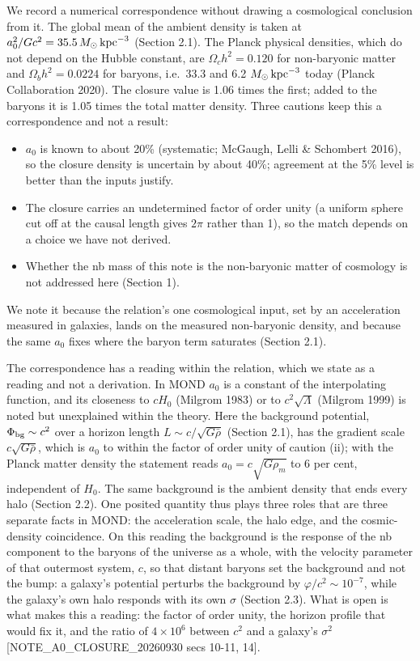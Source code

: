 \documentclass[
  10pt,
]{article}
\begin{document}
We record a numerical correspondence without drawing a cosmological
conclusion from it. The global mean of the ambient density is taken at
$a_0^2/Gc^2=35.5\,M_\odot\,{\rm kpc}^{-3}$ (Section 2.1). The Planck
physical densities, which do not depend on the Hubble constant, are
$\Omega_ch^2=0.120$ for non-baryonic matter and $\Omega_bh^2=0.0224$ for
baryons, i.e.\ 33.3 and 6.2 $M_\odot\,{\rm kpc}^{-3}$ today (Planck
Collaboration 2020). The closure value is 1.06 times the first; added to
the baryons it is 1.05 times the total matter density. Three cautions keep
this a correspondence and not a result:
\begin{itemize}
\item[(i)] $a_0$ is known to about 20\% (systematic; McGaugh, Lelli \& Schombert 2016), so the closure density is uncertain by about 40\%; agreement at the 5\% level is better than the inputs justify.
\item[(ii)] The closure carries an undetermined factor of order unity (a uniform sphere cut off at the causal length gives $2\pi$ rather than 1), so the match depends on a choice we have not derived.
\item[(iii)] Whether the nb mass of this note is the non-baryonic matter of cosmology is not addressed here (Section 1).
\end{itemize}
We note it because the relation's one cosmological input, set by an acceleration measured in galaxies, lands on the measured non-baryonic density, and because the same $a_0$ fixes where the baryon term saturates (Section 2.1).

The correspondence has a reading within the relation, which we state as a reading and not a derivation. In MOND $a_0$ is a constant of the interpolating function, and its closeness to $cH_0$ (Milgrom 1983) or to $c^2\sqrt{\Lambda}$ (Milgrom 1999) is noted but unexplained within the theory. Here the background potential, $\Phi_{\rm bg}\sim c^2$ over a horizon length $L\sim c/\sqrt{G\bar\rho}$ (Section 2.1), has the gradient scale $c\sqrt{G\bar\rho}$, which is $a_0$ to within the factor of order unity of caution (ii); with the Planck matter density the statement reads $a_0=c\sqrt{G\rho_m}$ to 6 per cent, independent of $H_0$. The same background is the ambient density that ends every halo (Section 2.2). One posited quantity thus plays three roles that are three separate facts in MOND: the acceleration scale, the halo edge, and the cosmic-density coincidence. On this reading the background is the response of the nb component to the baryons of the universe as a whole, with the velocity parameter of that outermost system, $c$, so that distant baryons set the background and not the bump: a galaxy's potential perturbs the background by $\varphi/c^2\sim10^{-7}$, while the galaxy's own halo responds with its own $\sigma$ (Section 2.3). What is open is what makes this a reading: the factor of order unity, the horizon profile that would fix it, and the ratio of $4\times10^6$ between $c^2$ and a galaxy's $\sigma^2$ {[}NOTE\_A0\_CLOSURE\_20260930 secs 10-11, 14{]}.
\end{document}
